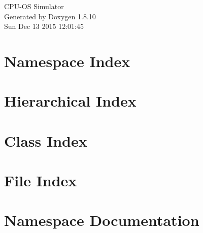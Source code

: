 \documentclass[twoside]{book}
\newcommand{\+}{\discretionary{\mbox{\scriptsize$\hookleftarrow$}}{}{}}
\newcommand{\clearemptydoublepage}{%
  \newpage{\pagestyle{empty}\cleardoublepage}%
}
\begin{document}
\hypersetup{pageanchor=false,
             bookmarks=true,
             bookmarksnumbered=true,
             pdfencoding=unicode
            }
\begin{titlepage}
\vspace*{7cm}
\begin{center}%
{\Large C\+P\+U-\/\+O\+S Simulator }\\
\vspace*{1cm}
{\large Generated by Doxygen 1.8.10}\\
\vspace*{0.5cm}
{\small Sun Dec 13 2015 12:01:45}\\
\end{center}
\end{titlepage}
\clearemptydoublepage
\tableofcontents
\clearemptydoublepage
{}
\hypersetup{pageanchor=true}

\chapter{Namespace Index}

\chapter{Hierarchical Index}

\chapter{Class Index}

\chapter{File Index}

\chapter{Namespace Documentation}










\end{document}
